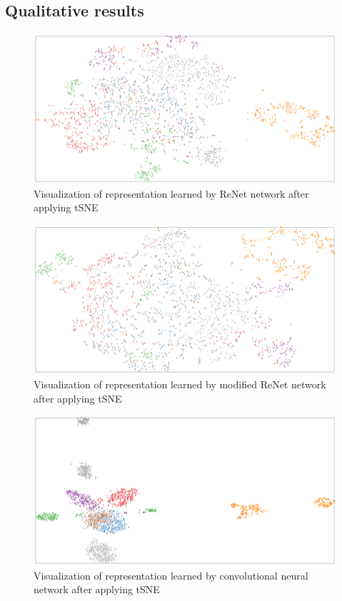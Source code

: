 \documentclass[a4paper, 10 pt, conference]{ieeeconf}
\begin{document}
\subsection{Qualitative results}

\begin{figure}
\centering
	\includegraphics[width=1.0\textwidth]{img/tSNE_ReNet.png}
	\caption{Visualization of representation learned by ReNet network after applying tSNE}
	\label{fig:tSNE_ReNet}
\end{figure}

\begin{figure}
\centering
	\includegraphics[width=1.0\textwidth]{img/tSNE_modif_ReNet.png}
	\caption{Visualization of representation learned by modified ReNet network after applying tSNE}
	\label{fig:tSNE_modif_ReNet}
\end{figure}

\begin{figure}
\centering
	\includegraphics[width=1.0\textwidth]{img/tSNE_conv.png}
	\caption{Visualization of representation learned by convolutional neural network after applying tSNE}
	\label{fig:tSNE_conv}
\end{figure}
\end{document}
